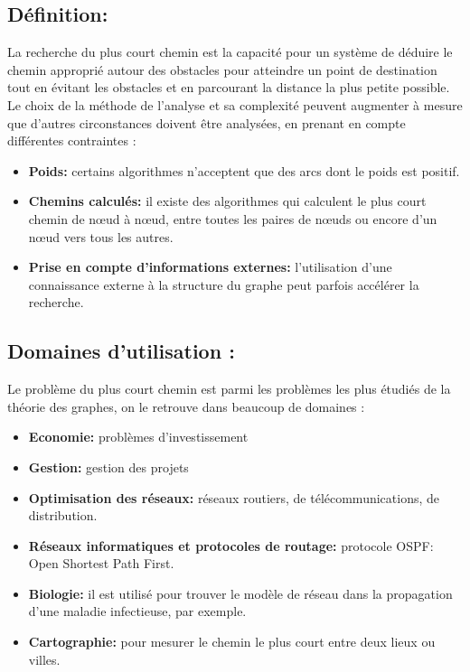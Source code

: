\subsection{Définition:}
La recherche du plus court chemin est la capacité pour un système de déduire le chemin approprié autour des obstacles pour atteindre un point de destination tout en évitant les obstacles et en parcourant la distance la plus petite possible.
Le choix de la méthode de l'analyse et sa complexité peuvent augmenter à mesure que d'autres circonstances doivent être analysées, en prenant en compte différentes contraintes :

\begin{itemize}
	\item \textbf{Poids:} certains algorithmes n'acceptent que des arcs dont le poids est positif.
	\item \textbf{Chemins calculés:} il existe des algorithmes qui calculent le plus court chemin de nœud à nœud, entre toutes les paires de nœuds ou encore d'un nœud vers tous les autres.
	\item \textbf{Prise en compte d'informations externes:} l'utilisation d'une connaissance externe à la structure du graphe peut parfois accélérer la recherche.
\end{itemize}

\subsection{Domaines d'utilisation :}
Le problème du plus court chemin est parmi les problèmes les plus étudiés de la théorie des graphes, on le retrouve dans beaucoup de domaines :
\begin{itemize}
\item\textbf{Economie:} problèmes d’investissement
\item\textbf{Gestion:} gestion des projets
\item\textbf{Optimisation des réseaux:} réseaux routiers, de télécommunications, de distribution.
\item\textbf{Réseaux informatiques et protocoles de routage:}   protocole OSPF: Open Shortest Path First.
\item\textbf{Biologie:} il est utilisé pour trouver le modèle de réseau dans la propagation d'une maladie infectieuse, par exemple.
\item\textbf{Cartographie:} pour mesurer le chemin le plus court entre deux lieux ou villes.
\end{itemize}

